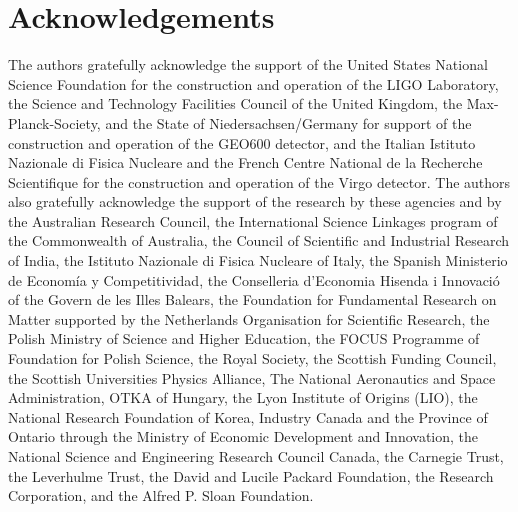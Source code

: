 \documentclass[12pt]{iopart}
\begin{document}
\section*{Acknowledgements}

The authors gratefully acknowledge the support of the United States
National Science Foundation for the construction and operation of the
LIGO Laboratory, the Science and Technology Facilities Council of the
United Kingdom, the Max-Planck-Society, and the State of
Niedersachsen/Germany for support of the construction and operation of
the GEO600 detector, and the Italian Istituto Nazionale di Fisica
Nucleare and the French Centre National de la Recherche Scientifique
for the construction and operation of the Virgo detector. The authors
also gratefully acknowledge the support of the research by these
agencies and by the Australian Research Council, 
the International Science Linkages program of the Commonwealth of Australia,
the Council of Scientific and Industrial Research of India, 
the Istituto Nazionale di Fisica Nucleare of Italy, 
the Spanish Ministerio de Econom\'ia y Competitividad,
the Conselleria d'Economia Hisenda i Innovaci\'o of the
Govern de les Illes Balears, the Foundation for Fundamental Research
on Matter supported by the Netherlands Organisation for Scientific Research, 
the Polish Ministry of Science and Higher Education, the FOCUS
Programme of Foundation for Polish Science,
the Royal Society, the Scottish Funding Council, the
Scottish Universities Physics Alliance, The National Aeronautics and
Space Administration, 
OTKA of Hungary,
the Lyon Institute of Origins (LIO),
the National Research Foundation of Korea,
Industry Canada and the Province of Ontario through the Ministry of Economic 
Development and Innovation, 
the National Science and Engineering Research Council Canada,
the Carnegie Trust, the Leverhulme Trust, the
David and Lucile Packard Foundation, the Research Corporation, and
the Alfred P. Sloan Foundation.
\end{document}
